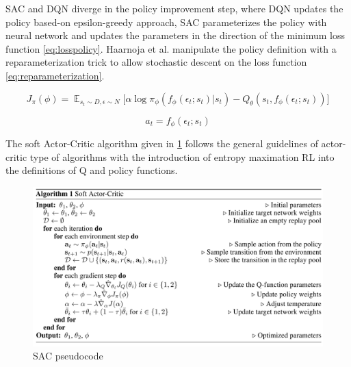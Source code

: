SAC and DQN diverge in the policy improvement step, where DQN updates the policy based-on epsilon-greedy approach, SAC parameterizes the policy with neural network and updates the parameters in the direction of the minimum loss function \ref{eq:losspolicy}. Haarnoja et al. manipulate the policy definition with a reparameterization trick to allow stochastic descent on the loss function \ref{eq:reparameterization}.

\begin{equation}
    J_{\pi}(\phi) = \mathop{\mathbb{E}}_{s_t \sim D, \epsilon \sim N} \Big[\alpha \log\pi_{\phi}(f_{\phi}(\epsilon_t;s_t)|s_t) - Q_{\theta}(s_t, f_{\phi}(\epsilon_t;s_t))\Big]
    \label{eq:losspolicy}
\end{equation}

\begin{equation}
    a_t = f_{\phi}(\epsilon_t; s_t)
    \label{eq:reparameterization}
\end{equation} 

The soft Actor-Critic algorithm given in \ref{fig:sacalgo} follows the general guidelines of actor-critic type of algorithms with the introduction of entropy maximation RL into the definitions of Q and policy functions.

\begin{figure}[htbp] 
    \centering
    \includegraphics[width=1.0\textwidth]{figures/SACalgo}
    \caption{SAC pseudocode \cite{Haarnoja2018}}
    \label{fig:sacalgo}
\end{figure}
